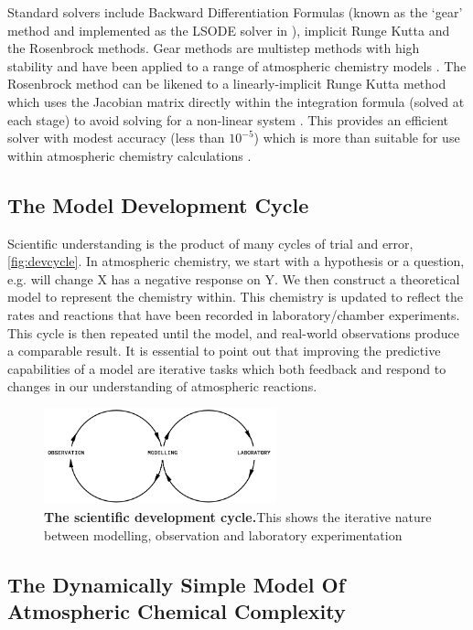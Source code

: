 Standard solvers include Backward Differentiation Formulas (known as the `gear' method and implemented as the LSODE solver in \citep{kpp}),  implicit Runge Kutta and the Rosenbrock methods. Gear methods are multistep methods with high stability and have been applied to a range of atmospheric chemistry models \citep{gear, geos, fundamentals}.
The Rosenbrock method can be likened to a linearly-implicit Runge Kutta method which uses the Jacobian matrix directly within the integration formula (solved at each stage) to avoid solving for a non-linear system \citep{solvers}. This provides an efficient solver with modest accuracy (less than $10^{-5}$) which is more than suitable for use within atmospheric chemistry calculations \citep{solvers,rosenbrock}.


\subsection{The Model Development Cycle}
Scientific understanding is the product of many cycles of trial and error, \autoref{fig:devcycle}. In atmospheric chemistry, we start with a hypothesis or a question, e.g. will change X has a negative response on Y. We then construct a theoretical model to represent the chemistry within. This chemistry is updated to reflect the rates and reactions that have been recorded in laboratory/chamber experiments. This cycle is then repeated until the model, and real-world observations produce a comparable result.
It is essential to point out that improving the predictive capabilities of a model are iterative tasks which both feedback and respond to changes in our understanding of atmospheric reactions.



\begin{figure}[H]
    \centering
    \includegraphics[width=0.6\textwidth]{devcycle.png}
    \caption{\textbf{The scientific development cycle.}This shows the iterative nature between modelling, observation and laboratory experimentation}
    \label{fig:devcycle}
\end{figure}

 \subsection{The Dynamically Simple Model Of Atmospheric Chemical Complexity}

